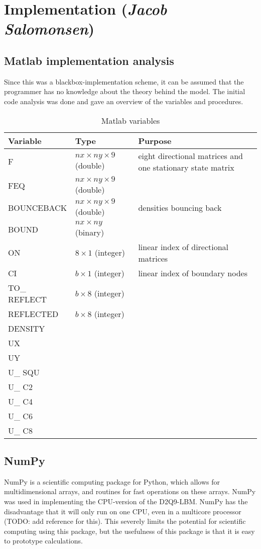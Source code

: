 \section{Implementation (\textit{Jacob Salomonsen})}


\subsection{Matlab implementation analysis}
Since this was a blackbox-implementation scheme, it can be assumed that the programmer has no knowledge about the theory behind the model. The initial code analysis was done and gave an overview of the variables and procedures.

\begin{table}[htb]
	\centering
	\begin{tabular}{llp{6cm}}
		\toprule
		Variable & Type & Purpose \\
		\midrule
		F 				& $nx\times ny\times 9$ (double)	& eight directional matrices and one stationary state matrix\\
		FEQ 			& $nx\times ny\times 9$ (double)	& \\
		BOUNCEBACK		& $nx\times ny\times 9$ (double) & densities bouncing back\\
		BOUND 			& $nx\times ny$ (binary) 		& \\
		ON				& $8\times 1$ (integer) 			& linear index of directional matrices\\
		CI				& $b\times 1$ (integer)			& linear index of boundary nodes\\
		TO\_ REFLECT 	& $b\times 8$ (integer) 			& \\
		REFLECTED 		& $b\times 8$ (integer) 			& \\
		DENSITY			& & \\
		UX				& & \\
		UY				& & \\
		U\_ SQU			& & \\
		U\_ C2			& & \\
		U\_ C4			& & \\
		U\_ C6			& & \\
		U\_ C8			& & \\
		\bottomrule
	\end{tabular}
	\label{matlabvars}
	\caption{Matlab variables}
\end{table}


\subsection{NumPy}
NumPy is a scientific computing package for Python, which allows for multidimensional arrays, and routines for fast operations on these arrays. NumPy was used in implementing the CPU-version of the D2Q9-LBM. NumPy has the disadvantage that it will only run on one CPU, even in a multicore processor (TODO: add reference for this). This severely limits the potential for scientific computing using this package, but the usefulness of this package is that it is easy to prototype calculations.

